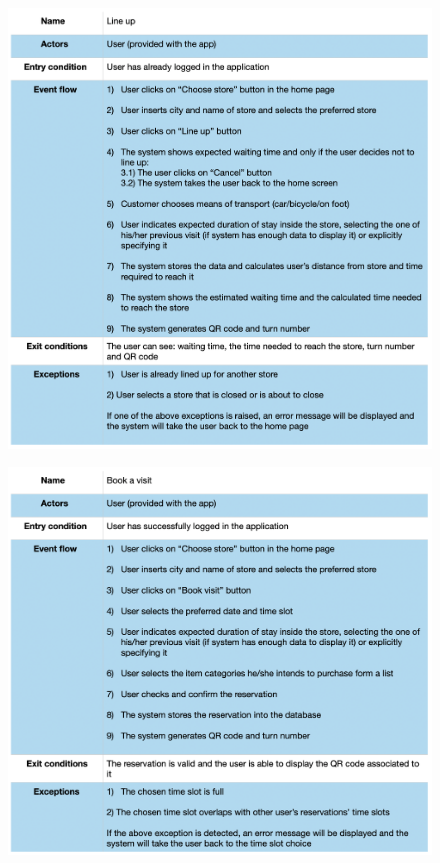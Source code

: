 \documentclass{article}
\begin{document}
\begin{figure}[H]
  \includegraphics[width=\linewidth]{LineUpUseCase.png}
  
\end{figure}

\begin{figure}[H]
  \includegraphics[width=\linewidth]{BookVisitUseCase.png}
  
\end{figure}
\end{document}
